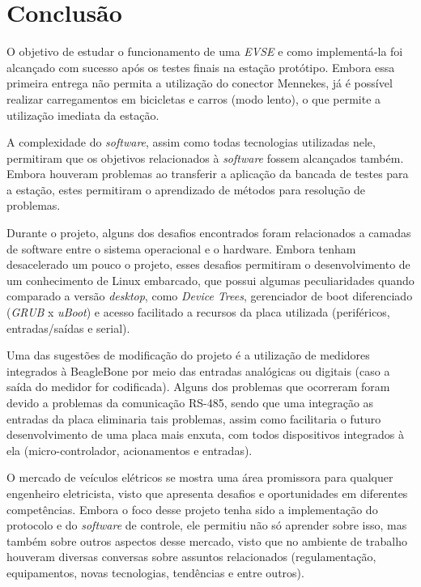 \chapter{Conclusão}
\label{stateofart:conclusion}

  O objetivo de estudar o funcionamento de uma \textit{\ac{EVSE}} e como implementá-la foi alcançado com sucesso após os testes finais na estação protótipo. Embora essa primeira entrega não permita a utilização do conector Mennekes, já é possível realizar carregamentos em bicicletas e carros (modo lento), o que permite a utilização imediata da estação.

  A complexidade do \textit{software}, assim como todas tecnologias utilizadas nele, permitiram que os objetivos relacionados à \textit{software} fossem alcançados também. Embora houveram problemas ao transferir a aplicação da bancada de testes para a estação, estes permitiram o aprendizado de métodos para resolução de problemas.

  Durante o projeto, alguns dos desafios encontrados foram relacionados a camadas de software entre o sistema operacional e o hardware. Embora tenham desacelerado um pouco o projeto, esses desafios permitiram o desenvolvimento de um conhecimento de Linux embarcado, que possui algumas peculiaridades quando comparado a versão \textit{desktop}, como \textit{Device Trees}, gerenciador de boot diferenciado (\textit{GRUB} x \textit{uBoot}) e acesso facilitado a recursos da placa utilizada (periféricos, entradas/saídas e serial).

  Uma das sugestões de modificação do projeto é a utilização de medidores integrados à BeagleBone por meio das entradas analógicas ou digitais (caso a saída do medidor for codificada). Alguns dos problemas que ocorreram foram devido a problemas da comunicação RS-485, sendo que uma integração as entradas da placa eliminaria tais problemas, assim como facilitaria o futuro desenvolvimento de uma placa mais enxuta, com todos dispositivos integrados à ela (micro-controlador, acionamentos e entradas).
  
  O mercado de veículos elétricos se mostra uma área promissora para qualquer engenheiro eletricista, visto que apresenta desafios e oportunidades em diferentes competências. Embora o foco desse projeto tenha sido a implementação do protocolo e do \textit{software} de controle, ele permitiu não só aprender sobre isso, mas também sobre outros aspectos desse mercado, visto que no ambiente de trabalho houveram diversas conversas sobre assuntos relacionados (regulamentação, equipamentos, novas tecnologias, tendências e entre outros).

